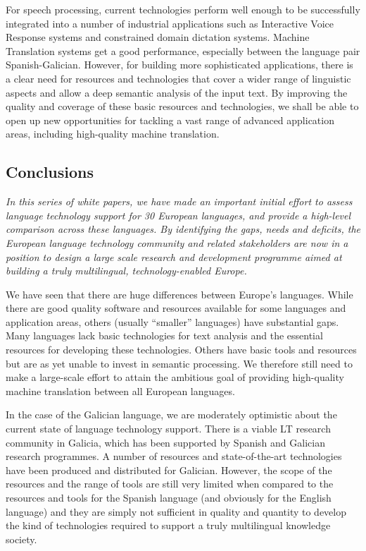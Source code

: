 \begin{multicols}{2}
\begin{itemize}
\begin{multicols}{2}
    For speech processing, current technologies perform well enough to be successfully integrated into a number of industrial applications such as Interactive Voice Response systems and constrained domain dictation systems. Machine Translation systems get a good performance, especially between the language pair Spanish-Galician. However, for building more sophisticated applications, there is a clear need for resources and technologies that cover a wider range of linguistic aspects and allow a deep semantic analysis of the input text. By improving the quality and coverage of these basic resources and technologies, we shall be able to open up new opportunities for tackling a vast range of advanced application areas, including high-quality machine translation.

\subsection{Conclusions}

    \emph{ In this series of white papers, we have made an important initial effort to assess language technology support for 30 European languages, and provide a high-level comparison across these languages. By identifying the gaps, needs and deficits, the European language technology community and related stakeholders are now in a position to design a large scale research and development programme aimed at building a truly multilingual, technology-enabled Europe.}

    We have seen that there are huge differences between Europe’s languages. While there are good quality software and resources available for some languages and application areas, others (usually “smaller” languages) have substantial gaps. Many languages lack basic technologies for text analysis and the essential resources for developing these technologies. Others have basic tools and resources but are as yet unable to invest in semantic processing. We therefore still need to make a large-scale effort to attain the ambitious goal of providing high-quality machine translation between all European languages. 

    In the case of the Galician language, we are moderately optimistic about the current state of language technology support. There is a viable LT research community in Galicia, which has been supported by Spanish and Galician research programmes. A number of resources and state-of-the-art technologies have been produced and distributed for Galician. However, the scope of the resources and the range of tools are still very limited when compared to the resources and tools for the Spanish language (and obviously for the English language) and they are simply not sufficient in quality and quantity to develop the kind of technologies required to support a truly multilingual knowledge society.


\end{multicols}
\end{itemize}
\end{multicols}
